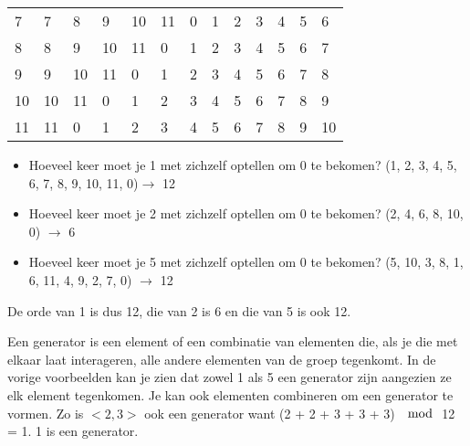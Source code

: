 \documentclass[12pt]{report}
\begin{document}
\begin{table}[]
\begin{tabular}{|l|llllllllllll}
		7  & 7                      & 8                      & 9                      & 10                     & 11                     & 0                      & 1                      & 2                      & 3                      & 4  & 5  & 6  \\ \cline{1-1}
		8  & 8                      & 9                      & 10                     & 11                     & 0                      & 1                      & 2                      & 3                      & 4                      & 5  & 6  & 7  \\ \cline{1-1}
		9  & 9                      & 10                     & 11                     & 0                      & 1                      & 2                      & 3                      & 4                      & 5                      & 6  & 7  & 8  \\ \cline{1-1}
		10 & 10                     & 11                     & 0                      & 1                      & 2                      & 3                      & 4                      & 5                      & 6                      & 7  & 8  & 9  \\ \cline{1-1}
		11 & 11                     & 0                      & 1                      & 2                      & 3                      & 4                      & 5                      & 6                      & 7                      & 8  & 9  & 10 \\ \cline{1-1}
	\end{tabular}
	\label{table:groepstabel}
\end{table}
\begin{itemize}
	\item Hoeveel keer moet je 1 met zichzelf optellen om 0 te bekomen? (1, 2, 3, 4, 5, 6, 7, 8, 9, 10, 11, 0)$\rightarrow$ 12
	\item Hoeveel keer moet je 2 met zichzelf optellen om 0 te bekomen? (2, 4, 6, 8, 10, 0) $\rightarrow$ 6
	\item Hoeveel keer moet je 5 met zichzelf optellen om 0 te bekomen? (5, 10, 3, 8, 1, 6, 11, 4, 9, 2, 7, 0) $\rightarrow$ 12
\end{itemize}
De orde van 1 is dus 12, die van 2 is 6 en die van 5 is ook 12.

Een generator is een element of een combinatie van elementen die, als je die met elkaar laat interageren, alle andere elementen 
van de groep tegenkomt. In de vorige voorbeelden kan je zien dat zowel 1 als 5 een generator zijn aangezien ze elk element tegenkomen.
Je kan ook elementen combineren om een generator te vormen. Zo is $<2, 3>$ ook een generator want (2 + 2 + 3 + 3 + 3) $\mod$ 12 = 1. 
1 is een generator.
\end{document}
